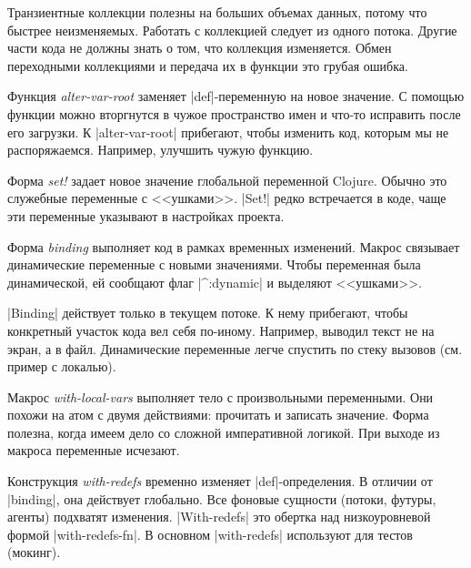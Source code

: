 Транзиентные коллекции полезны на больших объемах данных, потому что быстрее
неизменяемых. Работать с коллекцией следует из одного потока. Другие части кода
не должны знать о том, что коллекция изменяется. Обмен переходными коллекциями и
передача их в функции это грубая ошибка.

Функция \emph{alter-var-root} заменяет \spverb|def|-переменную на новое
значение. С помощью функции можно вторгнутся в чужое пространство имен и что-то
исправить после его загрузки. К \spverb|alter-var-root| прибегают, чтобы
изменить код, которым мы не распоряжаемся. Например, улучшить чужую функцию.

Форма \emph{set!} задает новое значение глобальной переменной Clojure. Обычно
это служебные переменные с <<ушками>>. \spverb|Set!| редко встречается в коде,
чаще эти переменные указывают в настройках проекта.

Форма \emph{binding} выполняет код в рамках временных изменений. Макрос
связывает динамические переменные с новыми значениями. Чтобы переменная была
динамической, ей сообщают флаг \spverb|^:dynamic| и выделяют
<<ушками>>.

\spverb|Binding| действует только в текущем потоке. К нему прибегают, чтобы
конкретный участок кода вел себя по-иному. Например, выводил текст не на экран,
а в файл. Динамические переменные легче спустить по стеку вызовов (см. пример с
локалью).

Макрос \emph{with-local-vars} выполняет тело с произвольными переменными. Они
похожи на атом с двумя действиями: прочитать и записать значение. Форма полезна,
когда имеем дело со сложной императивной логикой. При выходе из макроса
переменные исчезают.

Конструкция \emph{with-redefs} временно изменяет \spverb|def|-определения. В
отличии от \spverb|binding|, она действует глобально. Все фоновые сущности
(потоки, футуры, агенты) подхватят изменения. \spverb|With-redefs| это обертка
над низкоуровневой формой \spverb|with-redefs-fn|. В основном
\spverb|with-redefs| используют для тестов (мокинг).
